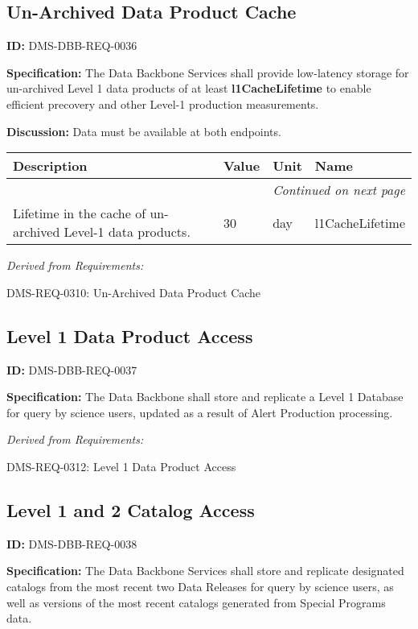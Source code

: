 \documentclass[SE,toc]{lsstdoc}
\makeatletter
\newcommand{\paramname}[1]{\hspace{0pt}#1}
\newcommand{\unitname}[1]{\hspace{0pt}#1}
\newenvironment{parameters}[0]{%
\setlength\LTleft{0pt}
\setlength\LTright{\fill}
\begin{small}
\begin{longtable}[]{|p{0.49\textwidth}|l|p{0.6in}|p{1.70in}@{}|}

\hline \textbf{Description} & \textbf{Value} & \textbf{Unit} & \textbf{Name} \\ \hline
\endhead

\hline \multicolumn{4}{r}{\emph{Continued on next page}} \\
\endfoot

\hline\hline
\endlastfoot
}{%
\hline
\end{longtable}
\end{small}
}
\makeatother
\begin{document}
\subsection{Un-Archived Data Product Cache}

\label{DMS-DBB-REQ-0036}
\textbf{ID:} DMS-DBB-REQ-0036

\textbf{Specification:}
The Data Backbone Services shall provide low-latency storage for un-archived Level 1 data products of at least \textbf{l1CacheLifetime} to enable efficient precovery and other Level-1 production measurements.

\textbf{Discussion:}
Data must be available at both endpoints.

\begin{parameters}
Lifetime in the cache of un-archived Level-1 data products.
&
30
&
\unitname{%
day
}
&
\paramname{%
l1CacheLifetime
} \\\hline
\end{parameters}

\emph{Derived from Requirements:}

DMS-REQ-0310:
Un-Archived Data Product Cache \newline

\subsection{Level 1 Data Product Access}

\label{DMS-DBB-REQ-0037}
\textbf{ID:} DMS-DBB-REQ-0037

\textbf{Specification:}
The Data Backbone shall store and replicate a Level 1 Database for query by science users, updated as a result of Alert Production processing.

\emph{Derived from Requirements:}

DMS-REQ-0312:
Level 1 Data Product Access \newline

\subsection{Level 1 and 2 Catalog Access}

\label{DMS-DBB-REQ-0038}
\textbf{ID:} DMS-DBB-REQ-0038

\textbf{Specification:}
The Data Backbone Services shall store and replicate designated catalogs from the most recent two Data Releases for query by science users, as well as versions of the most recent catalogs generated from Special Programs data.
\end{document}
